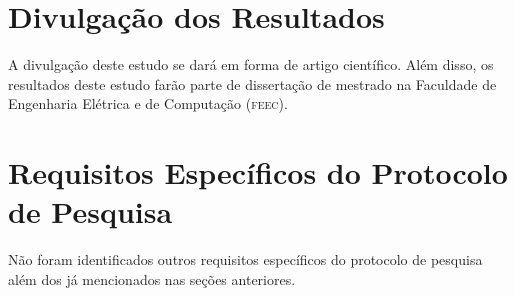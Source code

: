 \documentclass[a4paper,11pt,titlepage,singlespacing]{article}
\begin{document}
\section{Divulgação dos Resultados}
\noindent A divulgação deste estudo se dará em forma de artigo científico. Além disso, os resultados deste estudo farão parte de dissertação de mestrado na Faculdade de Engenharia Elétrica e de Computação (\textsc{feec}).

\section{Requisitos Específicos do Protocolo de Pesquisa}
\noindent Não foram identificados outros requisitos específicos do protocolo de pesquisa além dos já mencionados nas seções anteriores.







\newpage
{}

\end{document}
